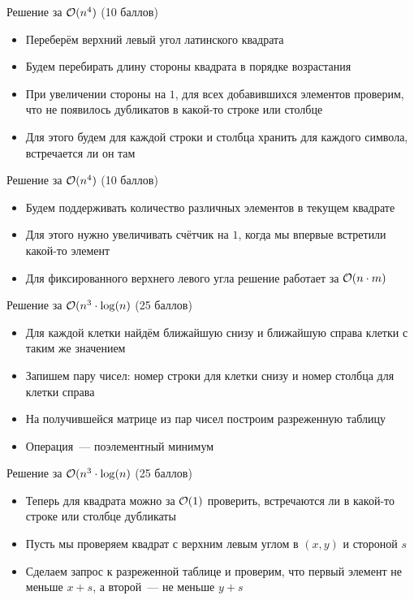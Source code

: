\begin{frame}{Решение за $\mathcal{O}(n ^ 4)$ (10 баллов)}
  \begin{itemize}
  \item Переберём верхний левый угол латинского квадрата
  \item Будем перебирать длину стороны квадрата в порядке возрастания
  \item При увеличении стороны на $1$, для всех добавившихся элементов проверим, что не появилось дубликатов в какой-то строке или столбце
  \item Для этого будем для каждой строки и столбца хранить для каждого символа, встречается ли он там
  \end{itemize}
\end{frame}

\begin{frame}{Решение за $\mathcal{O}(n ^ 4)$ (10 баллов)}
  \begin{itemize}
  \item Будем поддерживать количество различных элементов в текущем квадрате
  \item Для этого нужно увеличивать счётчик на $1$, когда мы впервые встретили какой-то элемент
  \item Для фиксированного верхнего левого угла решение работает за $\mathcal{O}(n \cdot m)$
  \end{itemize}
\end{frame}

\begin{frame}{Решение за $\mathcal{O}(n ^ 3 \cdot \log(n)$ (25 баллов)}
  \begin{itemize}
  \item Для каждой клетки найдём ближайшую снизу и ближайшую справа клетки с таким же значением
  \item Запишем пару чисел: номер строки для клетки снизу и номер столбца для клетки справа
  \item На получившейся матрице из пар чисел построим разреженную таблицу
  \item Операция~--- поэлементный минимум
  \end{itemize}
\end{frame}

\begin{frame}{Решение за $\mathcal{O}(n ^ 3 \cdot \log(n)$ (25 баллов)}
  \begin{itemize}
  \item Теперь для квадрата можно за $\mathcal{O}(1)$ проверить, встречаются ли в какой-то строке или столбце дубликаты
  \item Пусть мы проверяем квадрат с верхним левым углом в $(x, y)$ и стороной $s$
  \item Сделаем запрос к разреженной таблице и проверим, что первый элемент не меньше $x + s$, а второй~--- не меньше $y + s$
  \end{itemize}
\end{frame}

